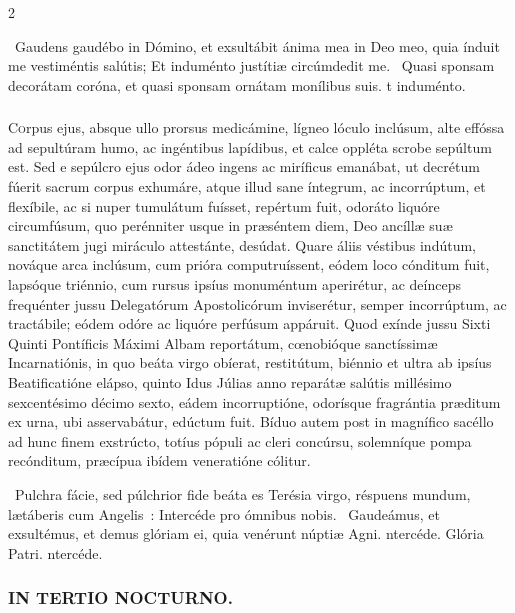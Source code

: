 \documentclass[9pt,twoside]{extarticle}
\begin{document}
\begin{multicols}{2}
{{\begin{tightlist}{}
\item {}~Gaudens gaudébo in Dómino, et exsultábit ánima mea in Deo meo, quia índuit me vestiméntis salútis; \textred{*} Et induménto justítiæ circúmdedit me. ~Quasi sponsam decorátam coróna, et quasi sponsam ornátam monílibus suis. t induménto.
\end{tightlist}

\subsubsection*{\center {}}
\lettrine{C}orpus ejus, absque ullo prorsus medicámine, lígneo lóculo inclúsum, alte effóssa ad sepultúram humo, ac ingéntibus lapídibus, et calce oppléta scrobe sepúltum est. Sed e sepúlcro ejus odor ádeo ingens ac miríficus emanábat, ut decrétum fúerit sacrum corpus exhumáre, atque illud sane íntegrum, ac incorrúptum, et flexíbile, ac si nuper tumulátum fuísset, repértum fuit, odoráto liquóre circumfúsum, quo perénniter usque in præséntem diem, Deo ancíllæ suæ sanctitátem jugi miráculo attestánte, desúdat. Quare áliis véstibus indútum, nováque arca inclúsum, cum prióra computruíssent, eódem loco cónditum fuit, lapsóque triénnio, cum rursus ipsíus monuméntum aperirétur, ac deínceps frequénter jussu Delegatórum Apostolicórum inviserétur, semper incorrúptum, ac tractábile; eódem odóre ac liquóre perfúsum appáruit. Quod exínde jussu Sixti Quinti Pontíficis Máximi Albam reportátum, cœnobióque sanctíssimæ Incarnatiónis, in quo beáta virgo obíerat, restitútum, biénnio et ultra ab ipsíus Beatificatióne elápso, quinto Idus Júlias anno reparátæ salútis millésimo sexcentésimo décimo sexto, eádem incorruptióne, odorísque fragrántia præditum ex urna, ubi asservabátur, edúctum fuit. Bíduo autem post in magnífico sacéllo ad hunc finem exstrúcto, totíus pópuli ac cleri concúrsu, solemníque pompa recónditum, præcípua ibídem veneratióne cólitur.

\begin{tightlist}{}
\item {}~Pulchra fácie, sed púlchrior fide beáta es Terésia virgo, réspuens mundum, lætáberis cum Angelis~: \textred{*} Intercéde pro ómnibus nobis. ~Gaudeámus, et exsultémus, et demus glóriam ei, quia venérunt núptiæ Agni. ntercéde. Glória Patri. ntercéde.
\end{tightlist}

\subsubsection*{\center \textsc{IN TERTIO NOCTURNO.}}
}}
\end{multicols}
\end{document}
